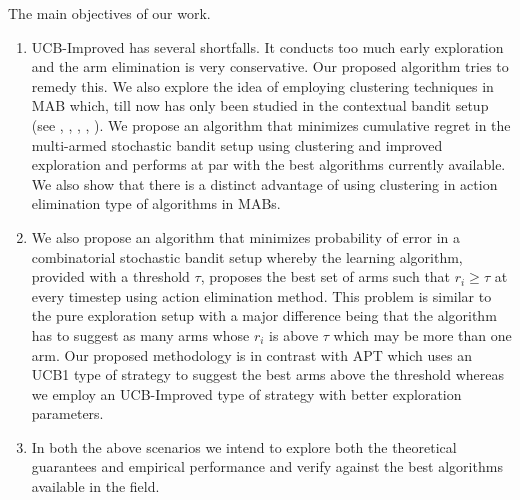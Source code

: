 The main objectives of our work.
\begin{enumerate}
\item UCB-Improved has several shortfalls. It conducts too much early exploration and the arm elimination is very conservative. Our proposed algorithm tries to remedy this. We also explore the idea of employing clustering techniques in MAB which, till now has only been studied in the contextual bandit setup (see \cite{li2010contextual}, \cite{bui2012clustered}, \cite{cesa2013gang} , \cite{gentile2014online}, \cite{nguyen2014dynamic}). We propose an algorithm that minimizes cumulative regret in the multi-armed stochastic bandit setup using clustering and improved exploration and performs at par with the best algorithms currently available. We also show that there is a distinct advantage of using clustering in action elimination type of algorithms in MABs.
\item We also propose an algorithm that minimizes probability of error in a combinatorial stochastic bandit setup whereby the learning algorithm, provided with a threshold $\tau$, proposes the best set of arms such that $r_{i}\geq \tau$ at every timestep using action elimination method. This problem is similar to the pure exploration setup with a major difference being that the algorithm has to suggest as many arms whose $r_{i}$ is above $\tau$ which may be more than one arm. Our proposed methodology is in contrast with APT which uses an UCB1 type of strategy to suggest the best arms above the threshold whereas we employ an UCB-Improved type of strategy with better exploration parameters.
\item In both the above scenarios we intend to explore both the theoretical guarantees and empirical performance and verify against the best algorithms available in the field.     
\end{enumerate}
